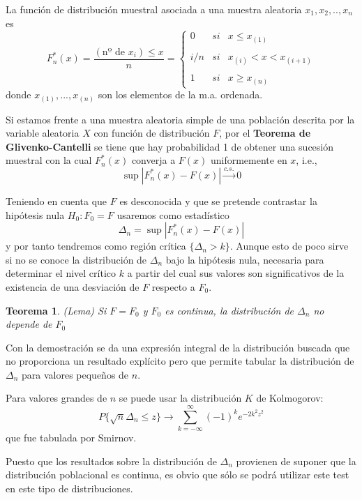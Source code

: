 \documentclass[a4paper,12pt]{article}
\newtheorem{theorem}{Teorema}
\begin{document}
La función de distribución muestral asociada a una muestra aleatoria $x_1, x_2,..,x_n$ es 
$$F^*_n(x) = \frac{(\textrm{nº de $x_i$}) \leq x}{n} = \left\{ \begin{array}{lcc}
             0 &   si  & x \leq x_{(1)} \\
             \\ i/n &  si & x_{(i)} < x < x_{(i+1)} \\
             \\ 1 &  si  & x \geq x_{(n)}
             \end{array}
   \right. $$
donde $x_{(1)},...,x_{(n)}$ son los elementos de la m.a. ordenada.

Si estamos frente a una muestra aleatoria simple de una población descrita por la variable aleatoria $X$ con función de distribución $F$, por el \textbf{Teorema de Glivenko-Cantelli} se tiene que hay probabilidad 1 de obtener una sucesión muestral con la cual $F^*_n(x)$ converja a $F(x)$ uniformemente en $x$, i.e.,
$$\sup |F^*_n(x) - F(x)| \xrightarrow{c.s.} 0$$

Teniendo en cuenta que $F$ es desconocida y que se pretende contrastar la hipótesis nula $H_0 : F_0 = F$ usaremos como estadístico
$$\Delta_n = \sup |F^*_n(x) - F(x)|  $$
y por tanto tendremos como región crítica $\{\Delta_n > k\}$. Aunque esto de poco sirve si no se conoce la distribución de $\Delta_n$ bajo la hipótesis nula, necesaria para determinar el nivel crítico $k$ a partir del cual sus valores son significativos de la existencia de una desviación de $F$ respecto a $F_0$.

\begin{theorem}
(Lema) Si $F = F_0$ y $F_0$ es continua, la distribución de $\Delta_n$ no depende de $F_0$
\end{theorem}
Con la demostración se da una expresión integral de la distribución buscada que no proporciona un resultado explícito pero que permite tabular la distribución de $\Delta_n$ para valores pequeños de $n$.

Para valores grandes de $n$ se puede usar la distribución $K$ de Kolmogorov:
$$P\{\sqrt{n}\Delta_n \leq z \} \longrightarrow \sum^{\infty}_{k=-\infty} (-1)^{k} e^{-2k^2 z^2}  $$
que fue tabulada por Smirnov.

Puesto que los resultados sobre la distribución de $\Delta_n$ provienen de suponer que la distribución poblacional es continua, es obvio que sólo se podrá utilizar este test en este tipo de distribuciones.
\end{document}
